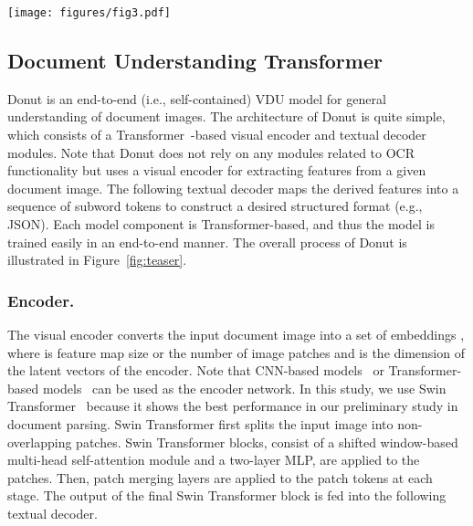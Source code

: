 \documentclass[runningheads]{llncs}
\newcommand\ours{{{\mbox{Donut}}}\xspace}
\newcommand\oursb{{\textbf{\mbox{Donut}}}\xspace}
\begin{document}
\begin{figure*}[t!]
    \centering
    \texttt{[image: figures/fig3.pdf]}
    \caption{{\bf The pipeline of \oursb.} The encoder maps a given document image into embeddings. With the encoded embeddings, the decoder generates a sequence of tokens that can be converted into a target type of information in a structured form} \label{fig:teaser}
\end{figure*}

\subsection{Document Understanding Transformer}
\ours is an end-to-end (i.e., self-contained) VDU model for general understanding of document images. The architecture of \ours is quite simple, which consists of a Transformer~\cite{vaswani2017transformer,dosovitskiy2020vit}-based visual encoder and textual decoder modules. Note that \ours does not rely on any modules related to OCR functionality but uses a visual encoder for extracting features from a given document image. The following textual decoder maps the derived features into a sequence of subword tokens to construct a desired structured format (e.g., JSON). Each model component is Transformer-based, and thus the model is trained easily in an end-to-end manner. The overall process of \ours is illustrated in Figure~\ref{fig:teaser}.



\subsubsection{Encoder.}


The visual encoder converts the input document image  into a set of embeddings , where  is feature map size or the number of image patches and   is the dimension of the latent vectors of the encoder.
Note that CNN-based models~\cite{HeZRS16} or Transformer-based models~\cite{dosovitskiy2020vit,Liu_2021_ICCV} can be used as the encoder network. In this study, we use Swin Transformer~\cite{Liu_2021_ICCV} because it shows the best performance in our preliminary study in document parsing. Swin Transformer first splits the input image  into non-overlapping patches.
Swin Transformer blocks, consist of a shifted window-based multi-head self-attention module and a two-layer MLP, are applied to the patches.
Then, patch merging layers are applied to the patch tokens at each stage.
The output of the final Swin Transformer block  is fed into the following textual decoder.
\end{document}
